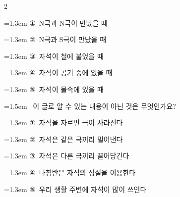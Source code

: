\documentclass[12pt, a4paper]{article}
\begin{document}
\begin{multicols}{2}
\begin{minipage}{\columnwidth}
\vspace{0.5mm}
{\hangindent=1.3em  \noindent\hspace{0.3em}①~N극과 N극이 만났을 때\par}
{\hangindent=1.3em  \noindent\hspace{0.3em}②~N극과 S극이 만났을 때\par}
{\hangindent=1.3em  \noindent\hspace{0.3em}③~자석이 철에 붙었을 때\par}
{\hangindent=1.3em  \noindent\hspace{0.3em}④~자석이 공기 중에 있을 때\par}
{\hangindent=1.3em  \noindent\hspace{0.3em}⑤~자석이 물속에 있을 때\par}
\vspace{4mm}
\end{minipage}
\par

\noindent\begin{minipage}{\columnwidth}
\vspace{2mm}
{\hangindent=1.5em  ~이 글로 알 수 있는 내용이 아닌 것은 무엇인가요?\par}

\vspace{0.5mm}
{\hangindent=1.3em  \noindent\hspace{0.3em}①~자석을 자르면 극이 사라진다\par}
{\hangindent=1.3em  \noindent\hspace{0.3em}②~자석은 같은 극끼리 밀어낸다\par}
{\hangindent=1.3em  \noindent\hspace{0.3em}③~자석은 다른 극끼리 끌어당긴다\par}
{\hangindent=1.3em  \noindent\hspace{0.3em}④~나침반은 자석의 성질을 이용한다\par}
{\hangindent=1.3em  \noindent\hspace{0.3em}⑤~우리 생활 주변에 자석이 많이 쓰인다\par}
\vspace{4mm}
\end{minipage}
\par

\end{multicols}
\newpage
\end{document}
